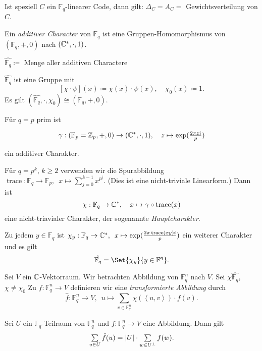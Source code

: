 \documentclass{cheat-sheet}
\newcommand{\F}{\mathbb{F}} %
\newcommand{\scp}[2]{\left\langle #1, #2 \right\rangle} %
\DeclareMathOperator{\trace}{trace} %
\begin{document}
\begin{prop}
  Ist speziell $C$ ein $\F_q$-linearer Code, dann gilt: $\Delta_C = A_C = $ Gewichtsverteilung von $C$.
\end{prop}


\begin{defn}
  Ein \emph{additiver Character} von $\F_q$ ist eine Gruppen-Homomorphismus von $(\F_q, +, 0)$ nach $(\mathbb{C}^*, \cdot, 1)$.
\end{defn}

\begin{nota}
  $\hat{\F_q} \coloneqq $ Menge aller additiven Charactere
\end{nota}

\begin{bem}
  $\hat{\F_q}$ ist eine Gruppe mit
  \[
    [\chi \cdot \psi](x) \coloneqq \chi(x) \cdot \psi(x), \quad
    \chi_0(x) \coloneqq 1.
  \]
  Es gilt $(\hat{\F_q}, \cdot, \chi_0) \cong (\F_q, +, 0)$.
\end{bem}


Für $q = p$ prim ist

\[
  \gamma : (\F_p = \Z_p, +, 0) \to (\C^*, \cdot, 1), \quad
  z \mapsto \exp(\tfrac{2 \pi z i}{p})
\]

ein additiver Charakter.

Für $q = p^k$, $k \geq 2$ verwenden wir die Spurabbildung
$\trace : \F_q \to \F_p, \enspace x \mapsto \sum_{j=0}^{k-1} x^{p^j}$.
(Dies ist eine nicht-triviale Linearform.)
Dann ist
\[
  \chi : \F_q \to \C^*, \quad
  x \mapsto \gamma \circ \trace(x)
\]
eine nicht-triavialer Charakter, der sogenannte \emph{Hauptcharakter}.

\begin{bem}
  Zu jedem $y \in \F_q$ ist $\chi_y : \F_q \to \C^*, \enspace x \mapsto \exp(\frac{2 \pi \trace(xy) i}{p})$ ein weiterer Charakter und es gilt
  \[ \hat{\F_q} = \Set{\chi_y}{y \in \F^q}. \]
\end{bem}

Sei $V$ ein $\mathbb{C}$-Vektorraum.
Wir betrachten Abbildung von $\F_q^n$ nach $V$.
Sei $\chi \hat{\F_q}$, $\chi \neq \chi_0$
Zu $f : \F_q^n \to V$ definieren wir eine \emph{transformierte Abbildung} durch
\[ \hat{f} : \F_q^n \to V, \enspace u \mapsto \sum_{v \in \F_q^n} \chi(\scp{u}{v}) \cdot f(v). \]

\begin{satz}
  Sei $U$ ein $\F_q$-Teilraum von $\F_q^n$ und $f : \F_q^n \to V$ eine Abbildung.
  Dann gilt
  \[
    \sum_{u \in U} \hat{f}(u) = \abs{U} \cdot \sum_{w \in U^\perp} f(w).
  \]
\end{satz}
\end{document}
